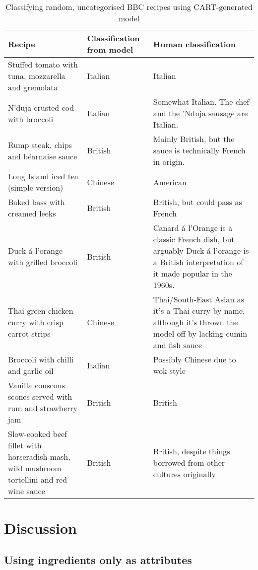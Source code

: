 \documentclass[11pt,a4paper]{article}
\begin{document}
\begin{sidewaystable}
  \centering
  \begin{tabular}{| p{9cm} | p{3cm} | p{9cm} |}
    \hline
    \textbf{Recipe} & \textbf{Classification from model} & \textbf{Human classification} \\
    \hline
    Stuffed tomato with tuna, mozzarella and gremolata & Italian & Italian \\
    \hline
    N’duja-crusted cod with broccoli & Italian & Somewhat Italian. The chef and the 'Nduja sausage are Italian. \\
    \hline
    Rump steak, chips and béarnaise sauce & British & Mainly British, but the sauce is technically French in origin. \\
    \hline
    Long Island iced tea (simple version) & Chinese & American \\
    \hline
    Baked bass with creamed leeks & British & British, but could pass as French \\
    \hline
    Duck \'a l'orange with grilled broccoli & British & Canard \'a l'Orange is a classic French dish, but arguably Duck \'a l'orange is a British interpretation of it made popular in the 1960s. \cite{hestonsfeasts} \\
    \hline
    Thai green chicken curry with crisp carrot strips & Chinese & Thai/South-East Asian as it's a Thai curry by name, although it's thrown the model off by lacking cumin and fish sauce \\
    \hline
    Broccoli with chilli and garlic oil & Italian & Possibly Chinese due to wok style \\
    \hline
    Vanilla couscous scones served with rum and strawberry jam & British & British \\
    \hline
    Slow-cooked beef fillet with horseradish mash, wild mushroom tortellini and red wine sauce & British & British, despite things borrowed from other cultures originally \\
    \hline
  \end{tabular}
  \caption{Classifying random, uncategorised BBC recipes using CART-generated model}
\end{sidewaystable}

\section{Discussion}
\subsection{Using ingredients only as attributes}
\end{document}
